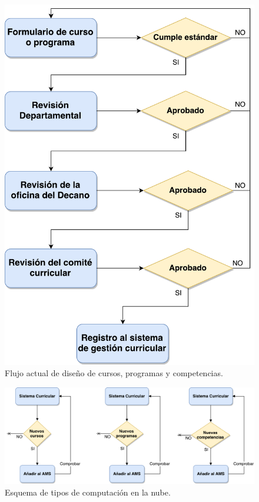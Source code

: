 \begin{figure}
\centering
\includegraphics[scale=0.5]{Capitulos/MarcoTeorico/Imagenes/course_creation_flow}
\caption{Flujo actual de diseño de cursos, programas y competencias.}
  \label{course_creation_flow}
\end{figure}

\begin{figure}
\centering
\includegraphics[width=125mm,scale=1]{Capitulos/MarcoTeorico/Imagenes/after_creation}
\caption{Esquema de tipos de computación en la nube.}
  \label{after_creation}
\end{figure}